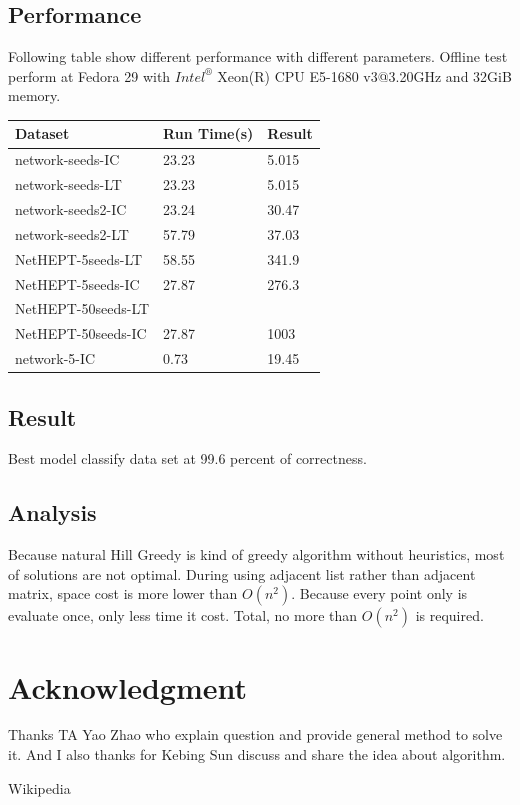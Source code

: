 \documentclass[conference,compsoc]{IEEEtran}
\begin{document}
\subsection{Performance}
Following table show different performance with different parameters. Offline
test perform at Fedora 29 with $Intel^{®}$ Xeon(R) CPU E5-1680 v3@3.20GHz and
32GiB memory.

\begin{center}
   \begin{tabular}{| l | l | l |}
   \hline
    Dataset             &Run Time(s)   &Result   \\ \hline
    network-seeds-IC     & 23.23        & 5.015  \\
    network-seeds-LT     & 23.23        & 5.015  \\
    network-seeds2-IC    & 23.24        & 30.47  \\ 
    network-seeds2-LT    & 57.79        & 37.03  \\
    NetHEPT-5seeds-LT    & 58.55        & 341.9  \\
    NetHEPT-5seeds-IC    & 27.87        & 276.3  \\
    NetHEPT-50seeds-LT    &         &   \\
    NetHEPT-50seeds-IC    & 27.87        & 1003  \\
    network-5-IC         & 0.73         & 19.45  \\
   \hline
   \end{tabular}
\end{center}

\subsection{Result}
Best model classify data set at 99.6 percent of correctness.

\subsection{Analysis}
Because natural Hill Greedy is kind of greedy algorithm without heuristics, most
of solutions are not optimal. During using adjacent list rather than adjacent
matrix, space cost is more lower than $O(n^2)$. Because every point only is
evaluate once, only less time it cost. Total, no more than $O(n^2)$ is required.

\section*{Acknowledgment}
Thanks TA Yao Zhao who explain question and provide general method to solve it.
And I also thanks for Kebing Sun discuss and share the idea about algorithm.


\begin{thebibliography}{1}
Wikipedia
\end{thebibliography}

\end{document}
